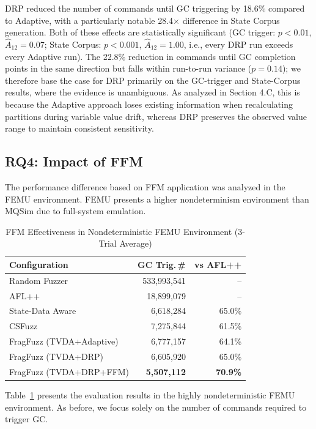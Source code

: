 \documentclass[conference]{IEEEtran}
\begin{document}
DRP reduced the number of commands until GC triggering by 18.6\% compared to Adaptive, with a particularly notable 28.4$\times$ difference in State Corpus generation.
Both of these effects are statistically significant (GC trigger: $p<0.01$, $\hat{A}_{12}=0.07$; State Corpus: $p<0.001$, $\hat{A}_{12}=1.00$, i.e., every DRP run exceeds every Adaptive run).
The 22.8\% reduction in commands until GC completion points in the same direction but falls within run-to-run variance ($p=0.14$); we therefore base the case for DRP primarily on the GC-trigger and State-Corpus results, where the evidence is unambiguous.
As analyzed in Section 4.C, this is because the Adaptive approach loses existing information when recalculating partitions during variable value drift, whereas DRP preserves the observed value range to maintain consistent sensitivity.

\subsection{RQ4: Impact of FFM}
The performance difference based on FFM application was analyzed in the FEMU environment.
FEMU presents a higher nondeterminism environment than MQSim due to full-system emulation.

\begin{table}[t]
\caption{FFM Effectiveness in Nondeterministic FEMU Environment (3-Trial Average)}
\label{tab:femu_ffm_effect}
\centering
\begin{tabularx}{\columnwidth}{@{}Xrr@{}}
\toprule
\textbf{Configuration} & \textbf{GC Trig.\,\#} & \textbf{vs AFL++} \\
\midrule
Random Fuzzer & 533,993,541 & -- \\
AFL++ & 18,899,079 & -- \\
State-Data Aware & 6,618,284 & 65.0\% \\
CSFuzz & 7,275,844 & 61.5\% \\
\midrule
FragFuzz (TVDA+Adaptive) & 6,777,157 & 64.1\% \\
FragFuzz (TVDA+DRP) & 6,605,920 & 65.0\% \\
FragFuzz (TVDA+DRP+FFM) & \textbf{5,507,112} & \textbf{70.9\%} \\
\bottomrule
\end{tabularx}
\end{table}

Table~\ref{tab:femu_ffm_effect} presents the evaluation results in the highly nondeterministic FEMU environment.
As before, we focus solely on the number of commands required to trigger GC.
\end{document}
